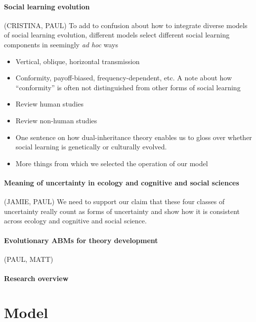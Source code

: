 \documentclass[letterpaper,11.5pt]{scrartcl}
\begin{document}
\paragraph{Social learning evolution} (CRISTINA, PAUL)
To add to confusion about how to integrate diverse models of social learning
evolution, different models select different social learning components in
seemingly \emph{ad hoc} ways 
\begin{itemize}
  \item 
    Vertical, oblique, horizontal transmission
  \item
    Conformity, payoff-biased, frequency-dependent, etc. A note about how
    ``conformity'' is often not distinguished from other forms of social learning
  \item
    Review human studies
  \item
    Review non-human studies~\cite{Leris2016,Aplin2017,Avargues-Weber2018,Baracchi2018}
  \item
    One sentence on how dual-inheritance theory enables us to gloss over whether
    social learning is genetically or culturally evolved.
  \item
    More things from which we selected the operation of our model
\end{itemize}

\paragraph{Meaning of uncertainty in ecology and cognitive and social sciences} (JAMIE, PAUL)
We need to support our claim that these four classes of uncertainty really 
count as forms of uncertainty and show how it is consistent across ecology and
cognitive and social science.

\paragraph{Evolutionary ABMs for theory development} (PAUL, MATT)

\paragraph{Research overview}

\section{Model}
\end{document}
